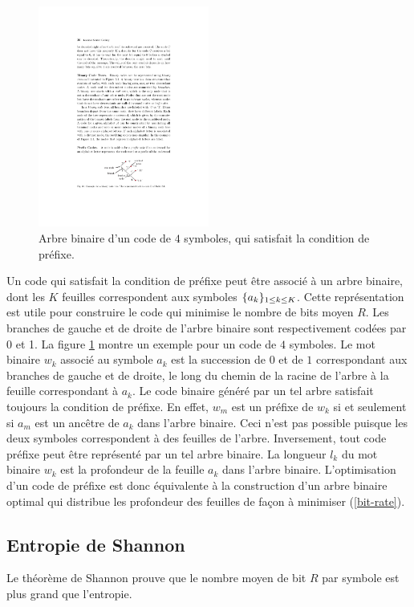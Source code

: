 \begin{figure}[bhtp]
\includegraphics[width=0.5\textwidth]{Figures/PrefixCode}
\caption{Arbre binaire d'un code de $4$ symboles,
qui satisfait la condition de pr\'efixe. }
\label{prefixe6}
\end{figure}

Un code qui satisfait la condition de pr\'efixe peut \^etre
associ\'e \`a un arbre binaire, dont les $K$ feuilles correspondent
aux symboles $\{a_k \}_{ 1 \leq k \leq K}$.
Cette repr\'esentation est utile pour construire le code
qui minimise le nombre de bits moyen $R$.
Les branches de gauche et de droite de l'arbre binaire sont
respectivement cod\'ees par 0 et 1.
La figure \ref{prefixe6} montre un exemple pour un code
de $4$ symboles.
Le mot binaire $w_k$ associ\'e au symbole $a_k$
est la succession de $0$ et de $1$ correspondant aux branches
de gauche et de droite, le long du chemin de la racine de
l'arbre \`a la feuille correspondant \`a $a_k$.
Le code binaire g\'en\'er\'e par un tel arbre satisfait toujours
la condition de pr\'efixe. En effet, $w_m$ est
un pr\'efixe de $w_k$ si et seulement si
$a_m$ est un anc\^etre de $a_k$ dans l'arbre binaire.
Ceci n'est pas possible puisque les deux symboles correspondent
\`a des feuilles de l'arbre.
Inversement, tout code pr\'efixe peut \^etre repr\'esent\'e par un tel
arbre binaire.
La longueur $l_k$ du mot binaire
$w_k$ est la profondeur de la feuille $a_k$ dans l'arbre binaire.
L'optimisation d'un code de pr\'efixe est donc \'equivalente \`a
la construction d'un arbre binaire optimal qui distribue
les profondeur des feuilles de fa\c con \`a minimiser
(\ref{bit-rate}).

\subsection{Entropie de Shannon}
Le th\'eor\`eme de Shannon prouve que le nombre moyen de bit $R$
par symbole est plus grand que l'entropie.

